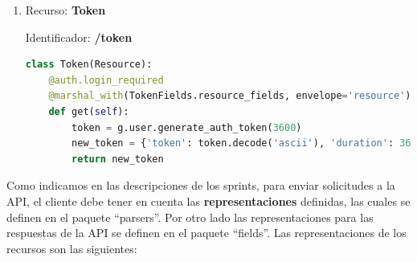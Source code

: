 \begin{enumerate}
\begin{lstlisting}[language=Python]
        # Obtiene todas las mediciones asociadas al perfil.
        measurements = measurement.get_by_profile(profile=profile, source_id=measurement_source_id, type_id=measurement_type_id, unit_id=measurement_unit_id)
        return measurements
\end{lstlisting}

\item Recurso: \textbf{Token}

Identificador: \textbf{/token}

\begin{lstlisting}[language=Python]
class Token(Resource):
    @auth.login_required
    @marshal_with(TokenFields.resource_fields, envelope='resource')
    def get(self):
        token = g.user.generate_auth_token(3600)
        new_token = {'token': token.decode('ascii'), 'duration': 3600}
        return new_token
\end{lstlisting}

\end{enumerate}

Como indicamos en las descripciones de los sprints, para enviar solicitudes a la API, el cliente debe tener en cuenta las \textbf{representaciones} definidas, las cuales se definen en el paquete ``parsers''. Por otro lado las representaciones para las respuestas de la API se definen en el paquete ``fields''. Las representaciones de los recursos son las siguientes:

